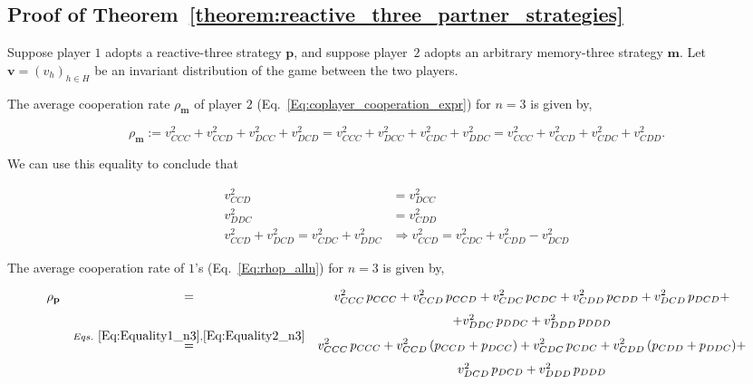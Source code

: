 \documentclass{article}
\theoremstyle{definition}
\begin{document}

\subsection{Proof of Theorem~\ref{theorem:reactive_three_partner_strategies}}\label{appendix:reactive_three_akin_generalized}

Suppose player $1$ adopts a reactive-three strategy $\mathbf{p}$, and suppose
player~$2$ adopts an arbitrary memory-three strategy $\mathbf{m}$. Let
$\mathbf{v}=(v_h)_{h\in H}$ be an invariant distribution of the game between the
two players.

The average cooperation rate $\rho_\mathbf{m}$ of player $2$
(Eq.~\ref{Eq:coplayer_cooperation_expr}) for $n=3$ is given by,

\begin{equation} \label{Eq:rhoq_n3}
\rho_\mathbf{m} := v^2_{CCC} + v^2_{CCD} + v^2_{DCC} + v^2_{DCD} = v^2_{CCC} + v^2_{DCC} + v^2_{CDC} + v^2_{DDC} = v^2_{CCC} + v^2_{CCD} + v^2_{CDC} + v^2_{CDD}.
\end{equation}

We can use this equality to conclude that

\begin{align} 
  v^{2}_{CCD} & = v^{2}_{DCC} \label{Eq:Equality1_n3} \\ 
  v^{2}_{DDC} & = v^{2}_{CDD} \label{Eq:Equality2_n3} \\  
  v^{2}_{CCD} + v^{2}_{DCD}  = v^{2}_{CDC} + v^{2}_{DDC} & \Rightarrow 
  v^{2}_{CCD} = v^{2}_{CDC} + v^{2}_{CDD} - v^{2}_{DCD} \label{Eq:Equality3_n3} 
\end{align}

The average cooperation rate of $1$'s (Eq.~\eqref{Eq:rhop_alln}) for $n=3$ is given by,

\begin{equation}\label{Eq:rhop_n3}
  \begin{array}{rcc}
  \rho_\mathbf{p} & = & \displaystyle v^2_{CCC}\, p_{CCC}+ v^2_{CCD}\, p_{CCD} + v^2_{CDC}\, p_{CDC} + v^2_{CDD}\, p_{CDD} + v^2_{DCD}\, p_{DCD} +  \\ [.7em]
  & & + v^2_{DDC}\, p_{DDC} + v^2_{DDD}\, p_{DDD} \\
  & \stackrel{Eqs.~\eqref{Eq:Equality1_n3}, \eqref{Eq:Equality2_n3}}{=} & \displaystyle v^2_{CCC}\, p_{CCC}+ v^2_{CCD}\, (p_{CCD} + p_{DCC}) + v^2_{CDC}\, p_{CDC} + v^2_{CDD}\, (p_{CDD} + p_{DDC}) + \\ [.7em]
  & & v^2_{DCD}\, p_{DCD} + v^2_{DDD}\, p_{DDD}
  \end{array}
\end{equation}
 
\end{document}
